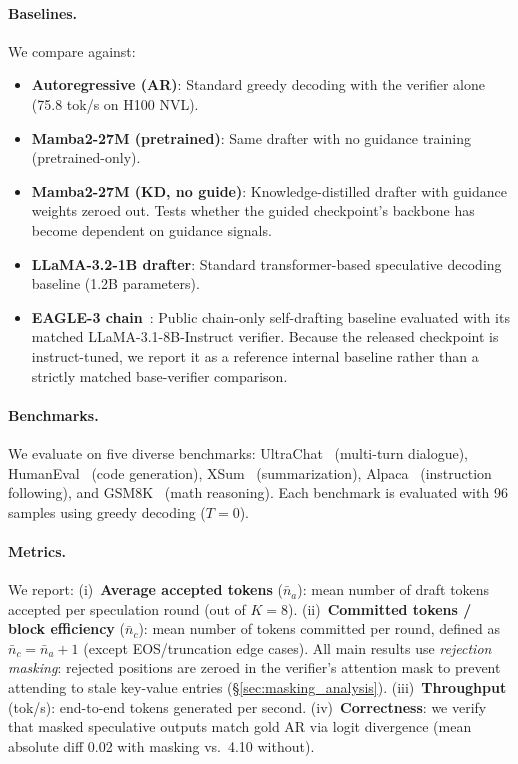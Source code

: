 \paragraph{Baselines.}
We compare against:
\begin{itemize}
  \item \textbf{Autoregressive (AR)}: Standard greedy decoding with the verifier alone (75.8 tok/s on H100 NVL).
  \item \textbf{Mamba2-27M (pretrained)}: Same drafter with no guidance training (pretrained-only).
  \item \textbf{Mamba2-27M (KD, no guide)}: Knowledge-distilled drafter with guidance weights zeroed out. Tests whether the guided checkpoint's backbone has become dependent on guidance signals.
  \item \textbf{LLaMA-3.2-1B drafter}: Standard transformer-based speculative decoding baseline (1.2B parameters).
  \item \textbf{EAGLE-3 chain}~\citep{li2024eagle3}: Public chain-only self-drafting baseline evaluated with its matched LLaMA-3.1-8B-Instruct verifier. Because the released checkpoint is instruct-tuned, we report it as a reference internal baseline rather than a strictly matched base-verifier comparison.
\end{itemize}

\paragraph{Benchmarks.}
We evaluate on five diverse benchmarks: UltraChat~\citep{ding2023ultrachat} (multi-turn dialogue), HumanEval~\citep{chen2021codex} (code generation), XSum~\citep{narayan2018xsum} (summarization), Alpaca~\citep{taori2023alpaca} (instruction following), and GSM8K~\citep{cobbe2021gsm8k} (math reasoning).
Each benchmark is evaluated with 96 samples using greedy decoding ($T\!=\!0$).

\paragraph{Metrics.}
We report:
(i)~\textbf{Average accepted tokens} ($\bar{n}_a$): mean number of draft tokens accepted per speculation round (out of $K\!=\!8$).
(ii)~\textbf{Committed tokens / block efficiency} ($\bar{n}_c$): mean number of tokens committed per round, defined as $\bar{n}_c = \bar{n}_a + 1$ (except EOS/truncation edge cases).
All main results use \emph{rejection masking}: rejected positions are zeroed in the verifier's attention mask to prevent attending to stale key-value entries (\S\ref{sec:masking_analysis}).
(iii)~\textbf{Throughput} (tok/s): end-to-end tokens generated per second.
(iv)~\textbf{Correctness}: we verify that masked speculative outputs match gold AR via logit divergence (mean absolute diff 0.02 with masking vs.\ 4.10 without).

